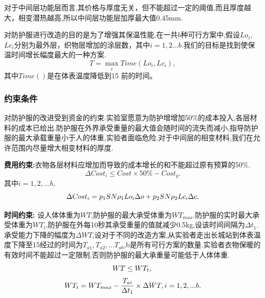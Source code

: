 \documentclass{whutmod}
\begin{document}
对于中间层功能层而言,其价格与厚度无关，但不能超过一定的阈值,而且厚度越大，相变潜热越高,所以中间层功能层加厚最大值0.45mm.

对防护服进行改造的目的是为了增强其保温性能,在一共$b$种可行方案中,假设$Lo_i$,$Lc_i$分别为最外层，织物层增加的涂层数，其中$i=1,2...b$.我们的目标是找到使保温时间增长幅度最大的一种方案.
\begin{equation} 
T=\max_{i} {Time(Lo_i, Lc_i)},
\end{equation}
其中$Time()$是在体表温度降低到15 \textcelsius 前的时间。

\subsubsection{约束条件}
对防护服的改进受到资金的约束.实验室愿意为防护增增加50\%的成本投入,各层材料的成本已给出.防护服在外界承受重量的最大值会随时间的流失而减小,指导防护服的最大承载重量小于人的体重,实验者面临危险.对于中间层的相变材料,我们在允许范围内尽量增大相变材料的厚度.

\textbf{费用约束:}衣物各层材料应增加而导致的成本增长的和不能超过原有预算的50\%.
\begin{equation}
\Delta Cost_{i}\leq Cost\times 50\%-Cost_{g}.
\end{equation}
其中$i=1,2,...b$,
\begin{equation}
	\Delta Cost_{i}=p_{1}SN \rho_{1} Lo_{i}\Delta o +p_{2}SN \rho_{2} Lc_{i}\Delta c.\\
\end{equation}


\textbf{时间约束:}
设人体体重为$WT$,防护服的最大承受体重为$WT_{max}$.防护服的实时最大承受体重为$WT_{t}$,防护服在外每10秒其承受重量的值就减少0.5kg,设该时间间隔为$\Delta t_{1}$.承受能力下降的幅度为$\Delta WT$,设对于不同的改造方案,从实验者走出长城站到体表温度下降至15\textcelsius 经过的时间为$T_{a1},T_{a2},...T_{ab}$,b是所有可行方案的数量.实验者衣物保暖的有效时间不能超过一定限制,否则防护服的最大承重量可能低于人体体重.
\begin{equation}
WT\leq WT_{t},\\
\end{equation}
\begin{equation}
WT_{t}= WT_{max}-\frac {T_{ai}}{\Delta t_{1}}\times \Delta WT,i=1,2,...b. \\
\end{equation}
\end{document}
